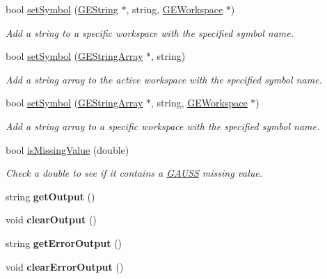 \begin{DoxyCompactItemize}
bool \hyperlink{class_g_a_u_s_s_abc42f75d55ce90767d8c3842c00fd8bc}{set\-Symbol} (\hyperlink{class_g_e_string}{G\-E\-String} $\ast$, string, \hyperlink{class_g_e_workspace}{G\-E\-Workspace} $\ast$)
\begin{DoxyCompactList}\small\item\em Add a string to a specific workspace with the specified symbol name. \end{DoxyCompactList}\item 
bool \hyperlink{class_g_a_u_s_s_a9d471d25f4c5acd0a8917239234a5bf5}{set\-Symbol} (\hyperlink{class_g_e_string_array}{G\-E\-String\-Array} $\ast$, string)
\begin{DoxyCompactList}\small\item\em Add a string array to the active workspace with the specified symbol name. \end{DoxyCompactList}\item 
bool \hyperlink{class_g_a_u_s_s_aeeac3739521597a74a4eed3640ba1a04}{set\-Symbol} (\hyperlink{class_g_e_string_array}{G\-E\-String\-Array} $\ast$, string, \hyperlink{class_g_e_workspace}{G\-E\-Workspace} $\ast$)
\begin{DoxyCompactList}\small\item\em Add a string array to a specific workspace with the specified symbol name. \end{DoxyCompactList}\item 
bool \hyperlink{class_g_a_u_s_s_a3e665b3b7d0733f27ca56427e6ec3d49}{is\-Missing\-Value} (double)
\begin{DoxyCompactList}\small\item\em Check a double to see if it contains a \hyperlink{class_g_a_u_s_s}{G\-A\-U\-S\-S} missing value. \end{DoxyCompactList}\item 
\hypertarget{class_g_a_u_s_s_abf9f8666ef413684b5f70352f5a89b77}{string {\bfseries get\-Output} ()}\label{class_g_a_u_s_s_abf9f8666ef413684b5f70352f5a89b77}

\item 
\hypertarget{class_g_a_u_s_s_a559e0215a8d9f6d24b9258927bb24533}{void {\bfseries clear\-Output} ()}\label{class_g_a_u_s_s_a559e0215a8d9f6d24b9258927bb24533}

\item 
\hypertarget{class_g_a_u_s_s_a14a6a4b692f7324ed09f1bbd6247758f}{string {\bfseries get\-Error\-Output} ()}\label{class_g_a_u_s_s_a14a6a4b692f7324ed09f1bbd6247758f}

\item 
\hypertarget{class_g_a_u_s_s_a7de5e45505c311bb52cb2f1c8f827d58}{void {\bfseries clear\-Error\-Output} ()}\label{class_g_a_u_s_s_a7de5e45505c311bb52cb2f1c8f827d58}


\end{DoxyCompactItemize}

